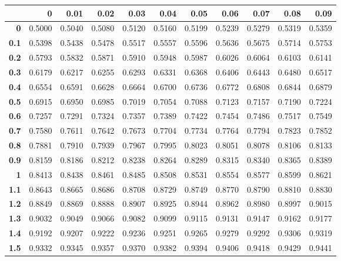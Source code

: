 \begin{table}[ht]
\centering
\begin{tabular}{rrrrrrrrrrr}
  \hline
& \textbf{0} & \textbf{0.01} & \textbf{0.02} & \textbf{0.03} & \textbf{0.04} & \textbf{0.05} & \textbf{0.06} & \textbf{0.07} & \textbf{0.08} & \textbf{0.09} \\
  \hline
  \textbf{0} & 0.5000 & 0.5040 & 0.5080 & 0.5120 & 0.5160 & 0.5199 & 0.5239 & 0.5279 & 0.5319 & 0.5359 \\
  \textbf{0.1} & 0.5398 & 0.5438 & 0.5478 & 0.5517 & 0.5557 & 0.5596 & 0.5636 & 0.5675 & 0.5714 & 0.5753 \\
  \textbf{0.2} & 0.5793 & 0.5832 & 0.5871 & 0.5910 & 0.5948 & 0.5987 & 0.6026 & 0.6064 & 0.6103 & 0.6141 \\
  \textbf{0.3} & 0.6179 & 0.6217 & 0.6255 & 0.6293 & 0.6331 & 0.6368 & 0.6406 & 0.6443 & 0.6480 & 0.6517 \\
  \textbf{0.4} & 0.6554 & 0.6591 & 0.6628 & 0.6664 & 0.6700 & 0.6736 & 0.6772 & 0.6808 & 0.6844 & 0.6879 \\
  \textbf{0.5} & 0.6915 & 0.6950 & 0.6985 & 0.7019 & 0.7054 & 0.7088 & 0.7123 & 0.7157 & 0.7190 & 0.7224 \\
  \textbf{0.6} & 0.7257 & 0.7291 & 0.7324 & 0.7357 & 0.7389 & 0.7422 & 0.7454 & 0.7486 & 0.7517 & 0.7549 \\
  \textbf{0.7} & 0.7580 & 0.7611 & 0.7642 & 0.7673 & 0.7704 & 0.7734 & 0.7764 & 0.7794 & 0.7823 & 0.7852 \\
  \textbf{0.8} & 0.7881 & 0.7910 & 0.7939 & 0.7967 & 0.7995 & 0.8023 & 0.8051 & 0.8078 & 0.8106 & 0.8133 \\
  \textbf{0.9} & 0.8159 & 0.8186 & 0.8212 & 0.8238 & 0.8264 & 0.8289 & 0.8315 & 0.8340 & 0.8365 & 0.8389 \\
  \textbf{1} & 0.8413 & 0.8438 & 0.8461 & 0.8485 & 0.8508 & 0.8531 & 0.8554 & 0.8577 & 0.8599 & 0.8621 \\
  \textbf{1.1} & 0.8643 & 0.8665 & 0.8686 & 0.8708 & 0.8729 & 0.8749 & 0.8770 & 0.8790 & 0.8810 & 0.8830 \\
  \textbf{1.2} & 0.8849 & 0.8869 & 0.8888 & 0.8907 & 0.8925 & 0.8944 & 0.8962 & 0.8980 & 0.8997 & 0.9015 \\
  \textbf{1.3} & 0.9032 & 0.9049 & 0.9066 & 0.9082 & 0.9099 & 0.9115 & 0.9131 & 0.9147 & 0.9162 & 0.9177 \\
  \textbf{1.4} & 0.9192 & 0.9207 & 0.9222 & 0.9236 & 0.9251 & 0.9265 & 0.9279 & 0.9292 & 0.9306 & 0.9319 \\
  \textbf{1.5} & 0.9332 & 0.9345 & 0.9357 & 0.9370 & 0.9382 & 0.9394 & 0.9406 & 0.9418 & 0.9429 & 0.9441 \\

\end{tabular}
\end{table}
